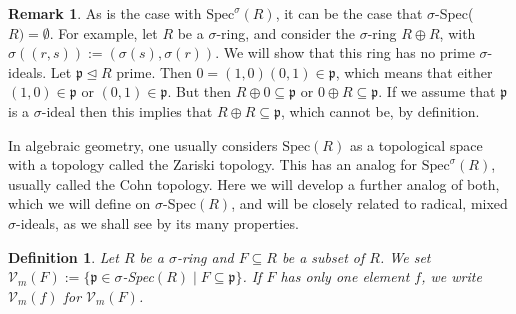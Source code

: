 \documentclass{article}
\def\Vm{\mathcal{V}_m}
\def\p{\mathfrak{p}}
\def\s{\sigma}
\def\Spec{\text{Spec}}
\theoremstyle{plain}
\newtheorem{defn}[Satz]{Definition}
\theoremstyle{definition}
\newtheorem{rem}[Satz]{Remark}
\begin{document}
\begin{rem}
As is the case with $\Spec^\s(R)$, it can be the case that $\s$-Spec($R)= \emptyset$. For example, let $R$ be a $\s$-ring, and consider the $\s$-ring $R \oplus R$, with $\s( (r,s)):= (\s(s),\s(r))$. 
We will show that this ring has no prime $\s$-ideals. Let $\p \unlhd R$ prime. Then $0 = (1,0)(0,1) \in \p$, which means that either $(1,0) \in \p$ or $(0,1) \in \p$. But then $R \oplus 0 \subseteq \p$ or $0 \oplus R \subseteq \p$. If we assume that $\p$ is a $\s$-ideal then
 this implies that $R \oplus R \subseteq \p$, which cannot be, by definition.
\end{rem}

In algebraic geometry, one usually considers $\Spec(R)$ as a topological space with a topology called the Zariski topology. This has an analog for $\Spec^\s(R)$, usually called the Cohn topology. Here we will develop a further analog of both,
 which we will define on $\s$-Spec$(R)$, and will be closely related to radical, mixed $\s$-ideals, as we shall see by its many properties.

\begin{defn}
Let $R$ be a $\s$-ring and $F \subseteq R$ be a subset of $R$. We set $\Vm (F):= \{ \p \in \s$-Spec$(R) \mid F \subseteq \p \}$. 
If $F$ has only one element $f$, we write $\Vm(f)$ for $\Vm(F)$. \index{$\Vm(F)$}
\end{defn}
\end{document}

